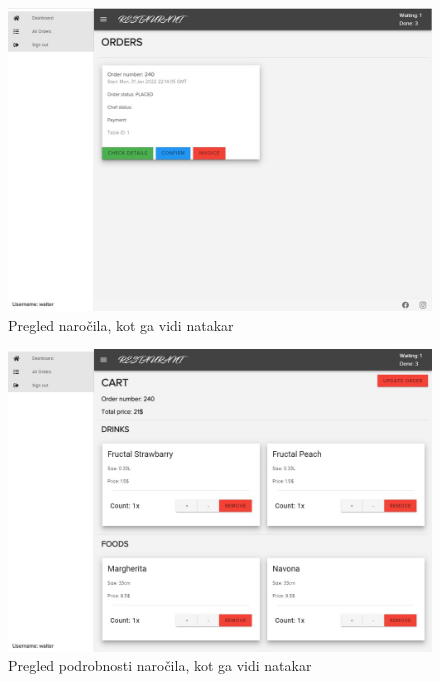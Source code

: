 \documentclass[a4paper, 12pt]{book}
\begin{document}
\begin{figure}
\centering
\includegraphics[width=12cm]{order_4.jpg}
\caption{Pregled naročila, kot ga vidi natakar}
\label{Opis3}
\end{figure}
\begin{figure}
\centering
\includegraphics[width=12cm]{order_5.jpg}
\caption{Pregled podrobnosti naročila, kot ga vidi natakar}
\label{Opis33}
\end{figure}
\end{document}
